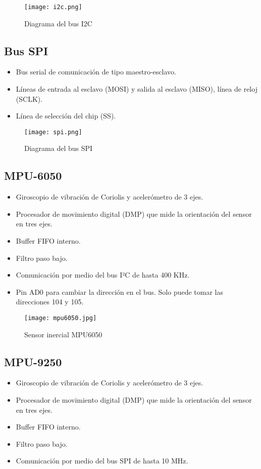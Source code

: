 \begin{figure}[htb]
	\centering
	\texttt{[image: i2c.png]}
	\caption{Diagrama del bus I2C}
\end{figure}

\subsection*{Bus SPI}
\begin{itemize}
	\item Bus serial de comunicación de tipo maestro-esclavo.
	\item Líneas de entrada al esclavo (MOSI) y salida al esclavo (MISO), línea de reloj (SCLK).
	\item Línea de selección del chip (SS).
\end{itemize}

\begin{figure}[htb]
	\centering
	\texttt{[image: spi.png]}
	\caption{Diagrama del bus SPI}
\end{figure}

\subsection*{MPU-6050}
\begin{itemize}
	\item Giroscopio de vibración de Coriolis y acelerómetro de 3 ejes.
	\item Procesador de movimiento digital (DMP) que mide la orientación del sensor en tres ejes.
	\item Buffer FIFO interno.
	\item Filtro paso bajo.
	\item Comunicación por medio del bus I²C de hasta 400 KHz.
	\item Pin AD0 para cambiar la dirección en el bus. Solo puede tomar las direcciones 104 y 105.
\end{itemize}

\begin{figure}[htb]
	\centering
	\texttt{[image: mpu6050.jpg]}
	\caption{Sensor inercial MPU6050}
\end{figure}

\subsection*{MPU-9250}
\begin{itemize}
	\item Giroscopio de vibración de Coriolis y acelerómetro de 3 ejes.
	\item Procesador de movimiento digital (DMP) que mide la orientación del sensor en tres ejes.
	\item Buffer FIFO interno.
	\item Filtro paso bajo.
	\item Comunicación por medio del bus SPI de hasta 10 MHz.
\end{itemize}

